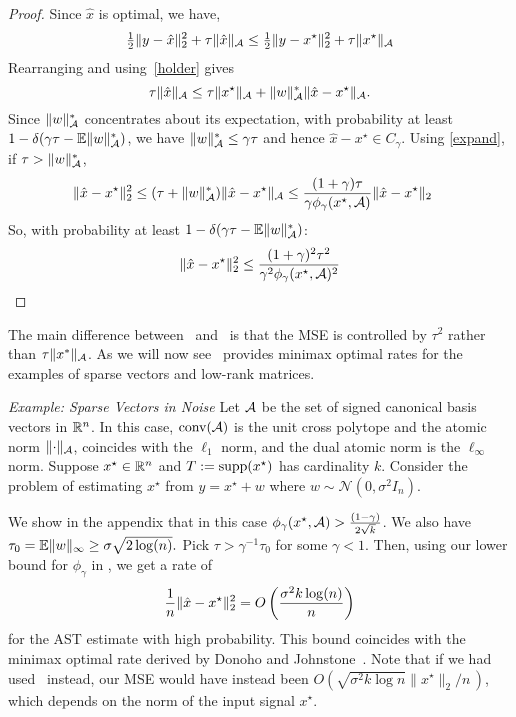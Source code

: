 \begin{proof}
Since $\hat{x}$ is optimal, we have,
\begin{equation*}
\tfrac{1}{2}\lVert y - \hat{x}\rVert_2^2 + \tau \lVert\hat{x}\rVert_{\mathcal{A}} \leq \tfrac{1}{2}\lVert y - x^\star\rVert_2^2 + \tau \lVert x^\star\rVert_{\mathcal{A}}
\end{equation*}
Rearranging and using~\eqref{holder} gives
\begin{equation*}
\tau\lVert\hat{x}\rVert_{\mathcal{A}} \leq \tau\lVert x^\star\rVert_{\mathcal{A}} + \lVert w\rVert_{\mathcal{A}}^* \lVert\hat{x} - x^\star\rVert_{\mathcal{A}}.
\end{equation*} 
Since $\lVert w\rVert_{\mathcal{A}}^*$ concentrates about its expectation, with
probability at least $1-\delta(\gamma\tau - \operatorname{\mathbb{E}}\lVert w\rVert_{\mathcal{A}}^*)$, we have $\lVert w\rVert_{\mathcal{A}}^* \leq \gamma \tau$ and hence $\hat{x} - x^\star \in
C_\gamma$.
Using \eqref{expand}, if $\tau > \lVert w\rVert_{\mathcal{A}}^*$, 
\begin{align*}
\lVert\hat{x}-x^\star\rVert_2^2 & \leq (\tau + \lVert w\rVert_{\mathcal{A}}^*)\lVert\hat{x}-x^\star\rVert_{\mathcal{A}} \leq \frac{(1+\gamma) \tau}{\gamma\phi_\gamma(x^\star,\mathcal{A})}\lVert\hat{x}-x^\star\rVert_2
\end{align*}
So, with probability at least $1-\delta(\gamma\tau - \operatorname{\mathbb{E}}\lVert w\rVert_{\mathcal{A}}^*)$:
\begin{equation*}\belowdisplayskip=-10pt
\vnorm{\hat{x}-x^\star}_2^2  \leq \frac{(1+\gamma)^2 \tau^2}{\gamma^2 \phi_\gamma(x^\star,\A)^2}
\end{equation*}
\end{proof}

The main difference between~ and~ is that the
MSE is controlled by $\tau^2$ rather than $\tau \| x^*\|_{\mathcal{A}}$.
As we will now see~ provides minimax optimal rates for the
examples of sparse vectors and low-rank matrices.

\emph{Example: Sparse Vectors in Noise}
Let $\mathcal{A}$ be the set of signed canonical basis
vectors in $\mathbb{R}^n$. In this case, $\operatorname{conv}(\mathcal{A})$ is the unit cross polytope and the
atomic norm $\lVert\cdot\rVert_{\mathcal{A}}$, coincides with the $\ell_1$ norm, and the dual
atomic norm is the $\ell_\infty$ norm. Suppose $x^\star \in \mathbb{R}^n$ and $T :=
\operatorname{supp}(x^\star)$ has cardinality $k$. Consider the problem of estimating
$x^\star$ from $y = x^\star + w$ where $w \sim \mathcal{N}(0,\sigma^2 I_n).$
 
We show in the appendix that in this case $\phi_\gamma(x^\star,\mathcal{A})
>\frac{(1-\gamma)}{2\sqrt{k}}$. We also have $\tau_0 = \operatorname{\mathbb{E}} \lVert w\rVert_\infty \geq
\sigma\sqrt{2\log(n)}.$ Pick $\tau > \gamma^{-1} \tau_0$ for some $\gamma < 1.$
Then, using our lower bound for $\phi_\gamma$ in , we get a
rate of
\begin{align}\label{eq:sparse-fast-rate}
\frac{1}{n}\lVert\hat{x}-x^\star\rVert_2^2 = O\left(\frac{\sigma^2 k\log(n)}{n}\right)
\end{align}
for the AST estimate with high probability. This bound coincides with
the minimax optimal rate derived by Donoho and Johnstone~\cite{Donoho94}. Note
that if we had used~ instead, our MSE would have
instead been $O\left(\sqrt{\sigma^2 k\log n}\|x^\star\|_2/n\,
\right)$, which depends on the norm of the input signal $x^\star$.

